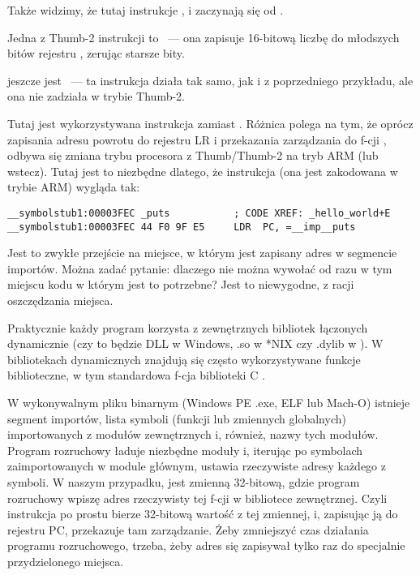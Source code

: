 Także widzimy, że tutaj instrukcje ,  i  zaczynają się od .

Jedna z Thumb-2 instrukcji to
~--- ona zapisuje 16-bitową liczbę do młodszych bitów rejestru , zerując starsze bity.

jeszcze jest ~--- ta instrukcja działa tak samo, jak i  z poprzedniego przykładu, ale ona nie zadziała w trybie Thumb-2.

Tutaj jest wykorzystywana instrukcja  zamiast .
Różnica polega na tym, że oprócz zapisania adresu powrotu do rejestru \ac{LR} i przekazania zarządzania 
do f-cji \puts, odbywa się zmiana trybu procesora z Thumb/Thumb-2 na tryb ARM (lub wstecz).
Tutaj jest to niezbędne dlatego, że instrukcja (ona jest zakodowana w trybie ARM) wygląda tak:

\begin{lstlisting}[style=customasmARM]
__symbolstub1:00003FEC _puts           ; CODE XREF: _hello_world+E
__symbolstub1:00003FEC 44 F0 9F E5     LDR  PC, =__imp__puts
\end{lstlisting}

Jest to zwykłe przejście na miejsce, w którym jest zapisany adres \puts w segmencie importów.
Można zadać pytanie: dlaczego nie można wywołać \puts od razu w tym miejscu kodu w którym jest to potrzebne?
Jest to niewygodne, z racji oszczędzania miejsca.

Praktycznie każdy program korzysta z zewnętrznych bibliotek łączonych dynamicznie (czy to będzie DLL w Windows, .so w *NIX 
czy .dylib w \MacOSX).
W bibliotekach dynamicznych znajdują się często wykorzystywane funkcje biblioteczne, w tym standardowa f-cja biblioteki C \puts.

W wykonywalnym pliku binarnym 
(Windows PE .exe, ELF lub Mach-O) istnieje segment importów, lista symboli (funkcji lub zmiennych globalnych) importowanych z modułów zewnętrznych i, również, nazwy tych modułów.
Program rozruchowy ładuje niezbędne moduły i, iterując po symbolach zaimportowanych w module głównym, ustawia rzeczywiste adresy każdego z symboli.
W naszym przypadku,  
jest zmienną 32-bitową, gdzie program rozruchowy wpiszę adres rzeczywisty tej f-cji w bibliotece zewnętrznej. 
Czyli instrukcja  po prostu bierze 32-bitową wartość z tej zmiennej, i, zapisując ją do rejestru \ac{PC}, przekazuje tam zarządzanie.
Żeby zmniejszyć czas działania programu rozruchowego, trzeba, żeby adres się zapisywał tylko raz do specjalnie przydzielonego miejsca.

